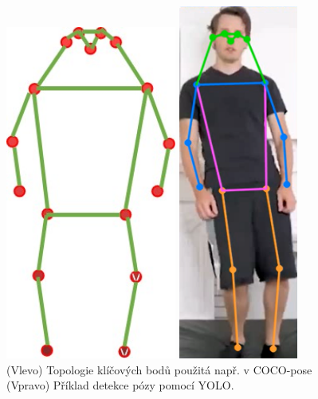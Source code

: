 \begin{figure}[]
    \centering
    \begin{minipage}{0.48\textwidth}
        \centering
        \includegraphics[width=0.5\textwidth]{Figures/keypoints.png}
    \end{minipage}
    \hfill
    \begin{minipage}{0.48\textwidth}
        \centering
        \includegraphics[width=0.35\textwidth]{Figures/pose1.png}
    \end{minipage}
    \caption{(Vlevo) Topologie klíčových bodů použitá např. v COCO-pose \cite{2dhpe} (Vpravo) Příklad detekce pózy pomocí YOLO.}
    \label{fig:keypoints}
\end{figure}

